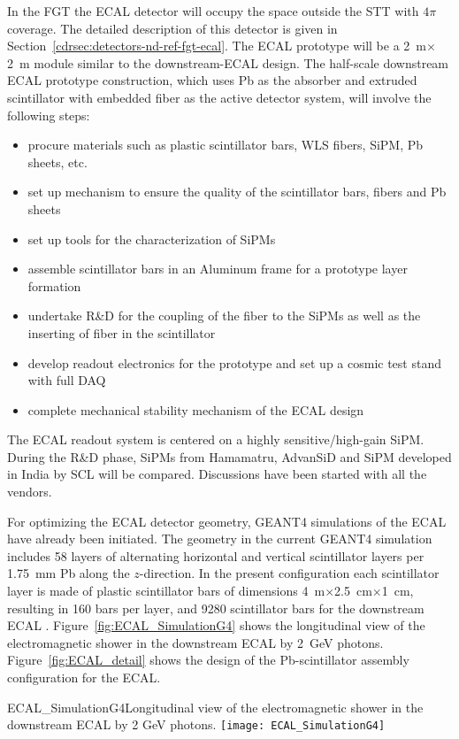 In the FGT the ECAL detector will occupy the space outside
the STT with $4\pi$ coverage.  The detailed description of this
detector is given in Section~\ref{cdrsec:detectors-nd-ref-fgt-ecal}.
The ECAL prototype will be a 2~m$\times$2~m module similar to the
downstream-ECAL design.  The half-scale downstream ECAL prototype
construction, which uses Pb as the absorber and extruded scintillator
with embedded fiber as the active detector system, will involve the
following steps:
\begin{itemize}
\item procure materials such as plastic scintillator bars, WLS fibers,
  SiPM, Pb sheets, etc.
\item set up mechanism to ensure the quality of the scintillator bars,
  fibers and Pb sheets
\item set up tools for the characterization of SiPMs
\item assemble scintillator bars in an Aluminum frame for a
  prototype layer formation
\item undertake R\&D for the coupling of the fiber to the SiPMs as well
  as the inserting of fiber in the scintillator
\item develop readout electronics for the prototype and set up a cosmic
  test stand with full DAQ
\item complete mechanical stability mechanism of the ECAL design 
\end{itemize}

The ECAL readout system is centered on a highly sensitive/high-gain SiPM. %
During the R\&D phase, SiPMs from Hamamatru, AdvanSiD and SiPM developed in India by SCL will be compared. 
Discussions have been started with all the vendors.


For optimizing the ECAL detector geometry, %
GEANT4
simulations of the ECAL have already been initiated. The geometry in
the current GEANT4 simulation includes 58 layers of alternating
horizontal and vertical scintillator layers per 1.75~mm Pb along the
$z$-direction. In
the present configuration each scintillator layer is made of plastic scintillator
bars of dimensions 4~m$\times$2.5~cm$\times$1~cm, resulting in 160
bars per layer, and \num{9280} scintillator bars for the downstream ECAL .  
Figure~\ref{fig:ECAL_SimulationG4} shows
the longitudinal view of the electromagnetic shower in the downstream
ECAL by 2~GeV photons. Figure~\ref{fig:ECAL_detail} shows the design
of the Pb-scintillator assembly configuration for the ECAL.
\begin{cdrfigure}
{ECAL_SimulationG4}{Longitudinal view of the electromagnetic shower in
the downstream ECAL by 2 GeV photons.}
\texttt{[image: ECAL\_SimulationG4]}
\end{cdrfigure}

